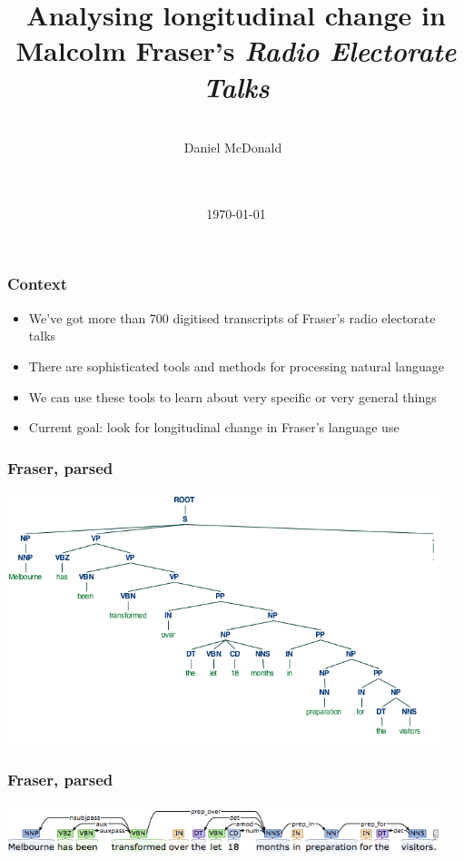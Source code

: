 \documentclass{beamer}       %
\title[University of Melbourne]{Analysing longitudinal change in Malcolm Fraser's \emph{Radio Electorate Talks}}
\author[Daniel McDonald]{~\\Daniel McDonald~\\~\\~\\\footnotesize}
\date{\today}
\begin{document}


\frame{\titlepage}

\begin{frame}
	\frametitle{Context}
	\begin{itemize}
	\item We've got more than 700 digitised transcripts of Fraser's radio electorate talks
	\item There are sophisticated tools and methods for processing natural language
	\item We can use these tools to learn about very specific or very general things
	\item Current goal: look for longitudinal change in Fraser's language use
	\end{itemize}
\end{frame}


\begin{frame}
    \frametitle{Fraser, parsed}
    \centering
    \includegraphics[width=0.95\textwidth]{images/melbtree}
\end{frame}

\begin{frame}
    \frametitle{Fraser, parsed}
    \centering
    \includegraphics[width=0.95\textwidth]{images/melbdep}
\end{frame}
\end{document}
